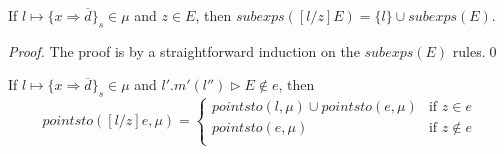 \documentclass{llncs}
\begin{document}
\begin{mdframed}
\begin{lemma}
\label{l:sub-in-ses}
If $l \mapsto \{ x \Rightarrow \overline{d} \}_s \in \mu$ and $z \in E$, then $subexps([l / z]E) = \{ l \} \cup subexps(E)$.
\end{lemma}
\end{mdframed}

\begin{proof}
The proof is by a straightforward induction on the $subexps(E)$ rules.\qed
\end{proof}


\newpage
\begin{mdframed}
\begin{lemma}
\label{l:sub-in-pt}
If $l \mapsto \{ x \Rightarrow \overline{d} \}_s \in \mu$ and $l'.m'(l'') \rhd E \not\in e$, then
\[
pointsto([l / z]e, \mu) =
\begin{cases}
    pointsto(l, \mu) \cup pointsto(e, \mu) & \text{if } z \in e\\
    pointsto(e, \mu) & \text{if } z \not\in e\\
\end{cases}
\]
\end{lemma}
\end{mdframed}
\end{document}

